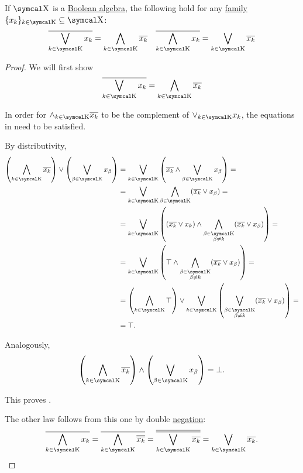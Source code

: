 \begin{Theorem}\label{thm:de_morgans_laws}
  If \( \CX \) is a \hyperref[def:boolean_algebra]{Boolean algebra}, the following hold for any \hyperref[def:indexed_family]{family} \( \{ x_k \}_{k \in \CK} \subseteq \CX \):
  \begin{align*}
    \Ol{\bigvee_{k \in \CK} x_k} = \bigwedge_{k \in \CK} \Ol{x_k}
    &&
    \Ol{\bigwedge_{k \in \CK} x_k} = \bigvee_{k \in \CK} \Ol{x_k}
  \end{align*}
\end{Theorem}
\begin{proof}
  We will first show
  \begin{equation}\label{thm:de_morgans_laws/equation}
    \Ol{\bigvee_{k \in \CK} x_k} = \bigwedge_{k \in \CK} \Ol{x_k}
  \end{equation}

  In order for \( \wedge_{k \in \CK} \Ol{x_k} \) to be the complement of \( \vee_{k \in \CK} x_k \), the equations in  need to be satisfied.

  By distributivity,
  \begin{align*}
    \left( \bigwedge_{k \in \CK} \Ol{x_k} \right) \vee \left( \bigvee_{\beta \in \CK} x_\beta \right)
    &=
    \bigvee_{k \in \CK} \left( \Ol{x_k} \wedge \bigvee_{\beta \in \CK} x_\beta \right)
    = \\ &=
    \bigvee_{k \in \CK} \bigwedge_{\beta \in \CK} (\Ol{x_k} \vee x_\beta)
    = \\ &=
    \bigvee_{k \in \CK} \left( (\Ol{x_k} \vee x_k) \wedge \bigwedge_{\substack{\beta \in \CK \\ \beta \neq k}} (\Ol{x_k} \vee x_\beta) \right)
    = \\ &=
    \bigvee_{k \in \CK} \left( \top \wedge \bigwedge_{\substack{\beta \in \CK \\ \beta \neq k}} (\Ol{x_k} \vee x_\beta) \right)
    = \\ &=
    \left( \bigwedge_{k \in \CK} \top \right) \vee \bigvee_{k \in \CK} \left( \bigvee_{\substack{\beta \in \CK \\ \beta \neq k}} (\Ol{x_k} \vee x_\beta) \right)
    = \\ &=
    \top.
  \end{align*}

  Analogously,
  \begin{equation*}
    \left( \bigwedge_{k \in \CK} \Ol{x_k} \right) \wedge \left( \bigvee_{\beta \in \CK} x_\beta \right) = \bot.
  \end{equation*}

  This proves .

  The other law follows from this one by double \hyperref[thm:boolean_algebra_properties]{negation}:
  \begin{equation*}
    \Ol{\bigwedge_{k \in \CK} x_k}
    =
    \Ol{\bigwedge_{k \in \CK} \Ol{\Ol{x_k}}}
    =
    \Ol{\Ol{\bigvee_{k \in \CK} \Ol{x_k}}}
    =
    \bigvee_{k \in \CK} \Ol{x_k}.
  \end{equation*}
\end{proof}


